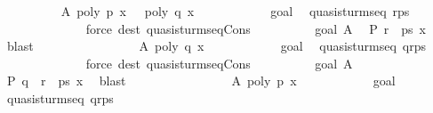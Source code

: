 \begin{isabellebody}
\ \ \ \ \ \ \ \ \isamarkupfalse%
\ A{\isacharcolon}\ {\isachardoublequoteopen}poly\ p\ x\ {\isasymnoteq}\ {}{\isachardoublequoteclose}\ {\isachardoublequoteopen}poly\ q\ x\ {\isacharequal}\ {}{\isachardoublequoteclose}\isanewline
\ \ \ \ \ \ \ \ \isamarkupfalse%
\ goal{}{\isacharparenleft}{}{\isacharparenright}\ \isamarkupfalse%
\ {\isachardoublequoteopen}quasi{\isacharunderscore}sturm{\isacharunderscore}seq\ {\isacharparenleft}r{\isacharhash}ps{\isacharparenright}{\isachardoublequoteclose}\ \isanewline
\ \ \ \ \ \ \ \ \ \ \ \ \isamarkupfalse%
\ {\isacharparenleft}force\ dest{\isacharcolon}\ quasi{\isacharunderscore}sturm{\isacharunderscore}seq{\isacharunderscore}Cons{\isacharparenright}\isanewline
\ \ \ \ \ \ \ \ \isamarkupfalse%
\ goal{}\ A\ \isamarkupfalse%
\ {\isachardoublequoteopen}P\ {\isacharparenleft}r\ {\isacharhash}\ ps{\isacharparenright}\ x{\isachardoublequoteclose}\ \isamarkupfalse%
\ blast\isanewline
\ \ \ \ \ \ \isamarkupfalse%
\isanewline
\ \ \ \ \ \ \ \ \isamarkupfalse%
\ A{\isacharcolon}\ {\isachardoublequoteopen}poly\ q\ x\ {\isasymnoteq}\ {}{\isachardoublequoteclose}\isanewline
\ \ \ \ \ \ \ \ \isamarkupfalse%
\ goal{}{\isacharparenleft}{}{\isacharparenright}\ \isamarkupfalse%
\ {\isachardoublequoteopen}quasi{\isacharunderscore}sturm{\isacharunderscore}seq\ {\isacharparenleft}q{\isacharhash}r{\isacharhash}ps{\isacharparenright}{\isachardoublequoteclose}\isanewline
\ \ \ \ \ \ \ \ \ \ \ \ \isamarkupfalse%
\ {\isacharparenleft}force\ dest{\isacharcolon}\ quasi{\isacharunderscore}sturm{\isacharunderscore}seq{\isacharunderscore}Cons{\isacharparenright}\isanewline
\ \ \ \ \ \ \ \ \isamarkupfalse%
\ goal{}\ A\ \isamarkupfalse%
\ {\isachardoublequoteopen}P\ {\isacharparenleft}q\ {\isacharhash}\ r\ {\isacharhash}\ ps{\isacharparenright}\ x{\isachardoublequoteclose}\ \isamarkupfalse%
\ blast\isanewline
\ \ \ \ \ \ \isamarkupfalse%
\isanewline
\ \ \ \ \ \ \ \ \isamarkupfalse%
\ A{\isacharcolon}\ {\isachardoublequoteopen}poly\ p\ x\ {\isacharequal}\ {}{\isachardoublequoteclose}\isanewline
\ \ \ \ \ \ \ \ \isamarkupfalse%
\ goal{}{\isacharparenleft}{}{\isacharparenright}\ \isamarkupfalse%
\ {\isachardoublequoteopen}quasi{\isacharunderscore}sturm{\isacharunderscore}seq\ {\isacharparenleft}q{\isacharhash}r{\isacharhash}ps{\isacharparenright}{\isachardoublequoteclose}\isanewline

\end{isabellebody}
